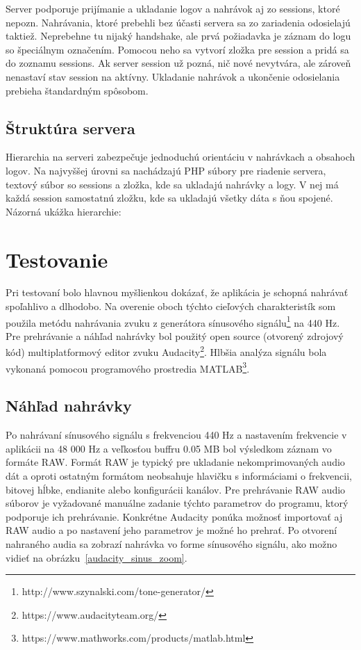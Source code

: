 Server podporuje prijímanie a ukladanie logov a nahrávok aj zo sessions, ktoré nepozn. Nahrávania, ktoré prebehli bez účasti servera sa zo zariadenia odosielajú taktiež. Neprebehne tu nijaký handshake, ale prvá požiadavka je záznam do logu so špeciálnym označením. Pomocou neho sa vytvorí zložka pre session a pridá sa do zoznamu sessions. Ak server session už pozná, nič nové nevytvára, ale zároveň nenastaví stav session na aktívny. Ukladanie nahrávok a ukončenie odosielania prebieha štandardným spôsobom.

\begin{pagebreakavoid}
\subsection*{Štruktúra servera}

Hierarchia na serveri zabezpečuje jednoduchú orientáciu v nahrávkach a obsahoch logov. Na najvyššej úrovni sa nachádzajú PHP súbory pre riadenie servera, textový súbor so sessions a zložka, kde sa ukladajú nahrávky a logy. V nej má každá session samostatnú zložku, kde sa ukladajú všetky dáta s ňou spojené. Názorná ukážka hierarchie:

\end{pagebreakavoid}

\section{Testovanie}

Pri testovaní bolo hlavnou myšlienkou dokázať, že aplikácia je schopná nahrávať spoľahlivo a dlhodobo. Na overenie oboch týchto cieľových charakteristík som použila metódu nahrávania zvuku z generátora sínusového signálu\footnote{http://www.szynalski.com/tone-generator/} na 440 Hz. Pre prehrávanie a náhľad nahrávky bol použitý open source (otvorený zdrojový kód) multiplatformový editor zvuku Audacity\footnote{https://www.audacityteam.org/}. Hlbšia analýza signálu bola vykonaná pomocou programového prostredia MATLAB\footnote{https://www.mathworks.com/products/matlab.html}.

\subsection*{Náhľad nahrávky}

Po nahrávaní sínusového signálu s frekvenciou 440 Hz a nastavením frekvencie v aplikácii na  48 000 Hz a veľkosťou buffru 0.05 MB bol výsledkom záznam vo formáte RAW. Formát RAW je typický pre ukladanie nekomprimovaných audio dát a oproti ostatným formátom neobsahuje hlavičku s informáciami o frekvencii, bitovej hĺbke, endianite alebo konfigurácii kanálov. Pre prehrávanie RAW audio súborov je vyžadované manuálne zadanie týchto parametrov do programu, ktorý podporuje ich prehrávanie. Konkrétne Audacity ponúka možnosť importovať aj RAW audio a po nastavení jeho parametrov je možné ho prehrať. Po otvorení nahraného audia sa zobrazí nahrávka vo forme sínusového signálu, ako možno vidieť na obrázku~\ref{audacity_sinus_zoom}.


